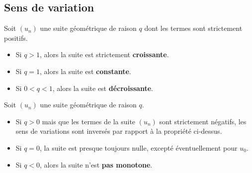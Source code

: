 \documentclass[11pt]{article}
\begin{document}
\begin{exemple}
\begin{minipage}{.45\textwidth}
\begin{center}
    \end{center}
  \end{minipage}
\end{exemple}

\subsection{Sens de variation}

\begin{prop}
  Soit $\left( u_n \right)$ une suite géométrique de raison $q$ dont les termes
  sont strictement positifs.
  \begin{itemize}
    \item Si $q>1$, alors la suite est strictement \textbf{croissante}.
    \item Si $q=1$, alors la suite est \textbf{constante}.
    \item Si $0<q<1$, alors la suite est \textbf{décroissante}.
  \end{itemize}
\end{prop}

\begin{rmq}
  Soit $\left( u_n \right)$ une suite géométrique de raison $q$.
  \begin{itemize}
    \item Si $q>0$ mais que les termes de la suite $(u_n)$ sont strictement
      négatifs, les sens de variations sont inversés par rapport à la propriété
      ci-dessus.
    \item Si $q=0$, la suite est presque toujours nulle, excepté éventuellement
      pour $u_0$.
    \item Si $q<0$, alors la suite n'est \textbf{pas monotone}.
  \end{itemize}
\end{rmq}
\end{document}
